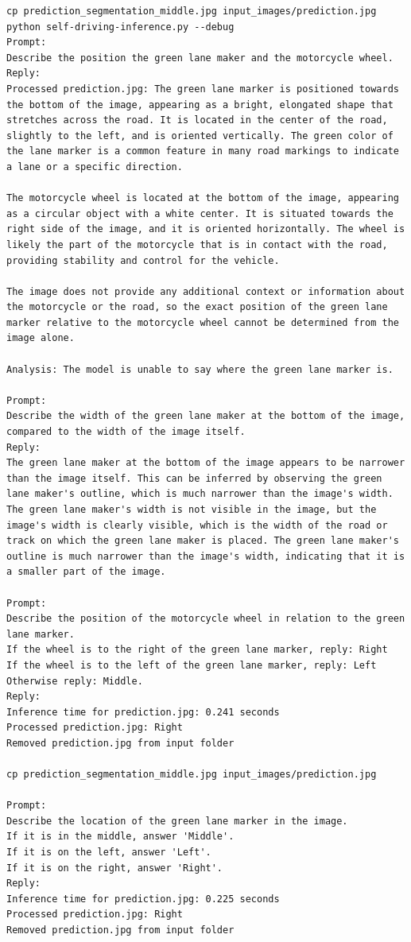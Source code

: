\begin{verbatim}
cp prediction_segmentation_middle.jpg input_images/prediction.jpg
python self-driving-inference.py --debug
Prompt:
Describe the position the green lane maker and the motorcycle wheel.
Reply:
Processed prediction.jpg: The green lane marker is positioned towards the bottom of the image, appearing as a bright, elongated shape that stretches across the road. It is located in the center of the road, slightly to the left, and is oriented vertically. The green color of the lane marker is a common feature in many road markings to indicate a lane or a specific direction.

The motorcycle wheel is located at the bottom of the image, appearing as a circular object with a white center. It is situated towards the right side of the image, and it is oriented horizontally. The wheel is likely the part of the motorcycle that is in contact with the road, providing stability and control for the vehicle.

The image does not provide any additional context or information about the motorcycle or the road, so the exact position of the green lane marker relative to the motorcycle wheel cannot be determined from the image alone.

Analysis: The model is unable to say where the green lane marker is.

Prompt:
Describe the width of the green lane maker at the bottom of the image, compared to the width of the image itself.
Reply:
The green lane maker at the bottom of the image appears to be narrower than the image itself. This can be inferred by observing the green lane maker's outline, which is much narrower than the image's width. The green lane maker's width is not visible in the image, but the image's width is clearly visible, which is the width of the road or track on which the green lane maker is placed. The green lane maker's outline is much narrower than the image's width, indicating that it is a smaller part of the image.

Prompt:
Describe the position of the motorcycle wheel in relation to the green lane marker.
If the wheel is to the right of the green lane marker, reply: Right
If the wheel is to the left of the green lane marker, reply: Left
Otherwise reply: Middle.
Reply:
Inference time for prediction.jpg: 0.241 seconds
Processed prediction.jpg: Right
Removed prediction.jpg from input folder

cp prediction_segmentation_middle.jpg input_images/prediction.jpg

Prompt:
Describe the location of the green lane marker in the image.
If it is in the middle, answer 'Middle'.
If it is on the left, answer 'Left'.
If it is on the right, answer 'Right'.
Reply:
Inference time for prediction.jpg: 0.225 seconds
Processed prediction.jpg: Right
Removed prediction.jpg from input folder


\end{verbatim}
